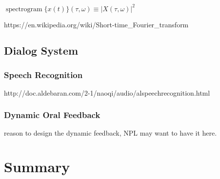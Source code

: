 ${\displaystyle \operatorname {spectrogram} \{x(t)\}(\tau ,\omega )\equiv |X(\tau ,\omega )|^{2}}$
 

https://en.wikipedia.org/wiki/Short-time_Fourier_transform

\subsection{Dialog System}

\subsubsection{Speech Recognition}
http://doc.aldebaran.com/2-1/naoqi/audio/alspeechrecognition.html

\subsubsection{Dynamic Oral Feedback}
reason to design the dynamic feedback, NPL may want to have it here. 



\section{Summary}


